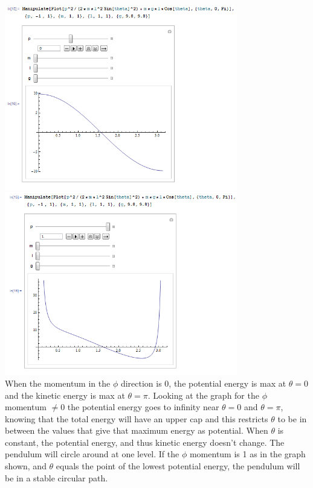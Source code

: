 \documentclass[a4paper,12pt]{article}
\begin{document}
\includegraphics[width=4in]{zero_p.png}\\
\includegraphics[width=4in]{positive_p.png}\\
When the momentum in the $\phi$ direction is 0, the potential energy is max at $\theta=0$ and the kinetic energy is max at $\theta = \pi$.  Looking at the graph for the $\phi$ momentum $\ne0$ the potential energy goes to infinity near $\theta=0$ and $\theta=\pi$, knowing that the total energy will have an upper cap and this restricts $\theta$ to be in between the values that give that maximum energy as potential.  When $\theta$ is constant, the potential energy, and thus kinetic energy doesn't change.  The pendulum will circle around at one level.  If the $\phi$ momentum is 1 as in the graph shown, and $\theta$ equals the point of the lowest potential energy, the pendulum will be in a stable circular path.
\end{document}
